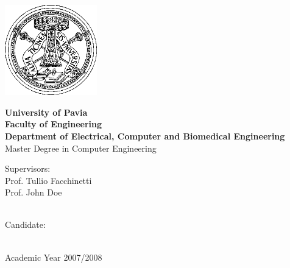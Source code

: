\frenchspacing
\frontmatter


\begin{titlepage}

\thispagestyle{empty}
\begin{center}
	\vskip 1cm
	\includegraphics[width=4cm]{figs/Logo-unipv-bw}
	\vskip 0.5cm
	
	\LARGE
		\textbf{University of Pavia}\\
		\textbf{Faculty of Engineering}\\
		\textbf{Department of Electrical, Computer and Biomedical Engineering}
		\vskip 0.5cm
	\Large
		Master Degree in Computer Engineering
	
	\vskip 1.5cm
	\Huge
		\textbf{\printtitle}
	\vskip 2.5cm
	
	\Large
		\begin{minipage}[t]{7cm}
			Supervisors:\\
			Prof. Tullio Facchinetti\\
			Prof. John Doe\\
			\\


		\end{minipage}
		\hfill
		\begin{minipage}[t]{5cm}
			Candidate:\\
			\printauthor\\
		\end{minipage}
		
		\vskip 3.5cm
		Academic Year 2007/2008
\end{center}

\vfill
\eject
\end{titlepage}
